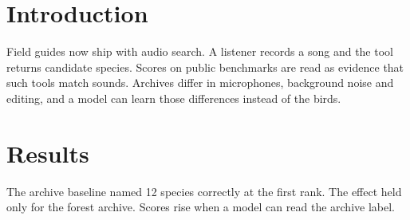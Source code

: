 \begin{abstract}
Song libraries are searched by people who need to name a bird from a field recording. We ask whether retrieval scores on such a library measure matching sounds to species or only matching recordings to the archive they came from. We built a small benchmark of forty recordings and tested three audio models against a baseline that sees only the archive label. One model beat that baseline, and only on a minority of queries.
\end{abstract}
\section{Introduction}
Field guides now ship with audio search. A listener records a song and the tool returns candidate species. Scores on public benchmarks are read as evidence that such tools match sounds. Archives differ in microphones, background noise and editing, and a model can learn those differences instead of the birds.
\section{Results}
The archive baseline named 12 species correctly at the first rank. The effect held only for the forest archive. Scores rise when a model can read the archive label.

